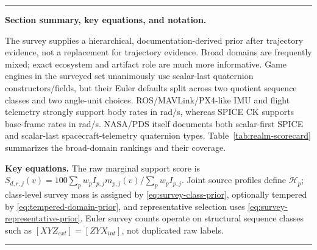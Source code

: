 \documentclass[11pt]{article}
\newenvironment{sectionrecap}
{\par\medskip\begingroup\small\noindent\rule{\linewidth}{0.4pt}\par
\smallskip\noindent\textbf{Section summary, key equations, and notation.}\par\smallskip}
{\par\smallskip\noindent\rule{\linewidth}{0.4pt}\par\endgroup\medskip}
\begin{document}
    \begin{sectionrecap}
        The survey supplies a hierarchical, documentation-derived prior after trajectory
        evidence, not a replacement for trajectory evidence. Broad domains are frequently
        mixed; exact ecosystem and artifact role are much more informative. Game engines in
        the surveyed set unanimously use scalar-last quaternion constructors/fields, but their
        Euler defaults split across two quotient sequence classes and two angle-unit choices.
        ROS/MAVLink/PX4-like IMU and flight telemetry strongly support body rates in rad/s,
        whereas SPICE CK supports base-frame rates in rad/s. NASA/PDS itself documents both
        scalar-first SPICE and scalar-last spacecraft-telemetry quaternion types.
        Table~\ref{tab:realm-scorecard} summarizes the broad-domain rankings and their coverage.

        \noindent\textbf{Key equations.}
        The raw marginal support score is
        \(S_{d,r,j}(v)=100\sum_p w_p I_{p,j}m_{p,j}(v)/\sum_p w_p I_{p,j}\).
        Joint source profiles define $\mathcal H_p$; class-level survey mass is assigned by
        \eqref{eq:survey-class-prior}, optionally tempered by \eqref{eq:tempered-domain-prior},
        and representative selection uses \eqref{eq:survey-representative-prior}. Euler survey
        counts operate on structural sequence classes such as
        $[XYZ_{ext}]=[ZYX_{int}]$, not duplicated raw labels.


\end{sectionrecap}
\end{document}
